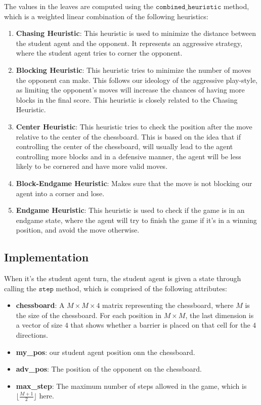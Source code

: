 \documentclass[11pt]{article}
\begin{document}
The values in the leaves are computed using the $\texttt{combined\_heuristic}$ method, which is a weighted linear combination of the following heuristics:
\begin{enumerate}
    \item \textbf{Chasing Heuristic}: This heuristic is used to minimize the distance between the student agent and the opponent. It represents an aggressive strategy, where the student agent tries to corner the opponent.
    \item \textbf{Blocking Heuristic}: This heuristic tries to minimize the number of moves the opponent can make. This follows our ideology of the aggressive play-style, as limiting the opponent's moves will
    increase the chances of having more blocks in the final score. This heuristic is closely related to the Chasing Heuristic.
    \item \textbf{Center Heuristic}: This heuristic tries to check the position after the move relative to the center of the chessboard. This is based on the idea that if controlling the center of the chessboard,
    will usually lead to the agent controlling more blocks and in a defensive manner, the agent will be less likely to be cornered and have more valid moves.
    \item \textbf{Block-Endgame Heuristic}: Makes sure that the move is not blocking our agent into a corner and lose.
    \item \textbf{Endgame Heuristic}: This heuristic is used to check if the game is in an endgame state, where the agent will try to finish the game if it's in a winning position, and avoid the move otherwise.
\end{enumerate}

\subsection{Implementation}
When it's the student agent turn, the student agent is given a state through calling the $\texttt{step}$ method, which is comprised of the following attributes:
\begin{itemize}
    \item \textbf{chessboard}: A $M\times M \times 4$ matrix representing the chessboard, where $M$ is the size of the chessboard. For each position in $M \times M$, the last dimension is a vector of size $4$ that shows whether a barrier is placed on that cell for the $4$ directions.
    \item \textbf{my\_pos}: our student agent position onn the chessboard.
    \item \textbf{adv\_pos}: The position of the opponent on the chessboard.
    \item \textbf{max\_step}: The maximum number of steps allowed in the game, which is $\lfloor \frac{M+1}{2} \rfloor$ here.
\end{itemize}
\end{document}
